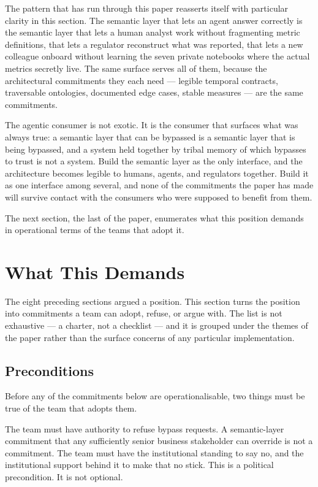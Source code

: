 \documentclass[11pt,a4paper]{article}
\begin{document}
The pattern that has run through this paper reasserts itself with particular clarity in this section. The semantic layer that lets an agent answer correctly is the semantic layer that lets a human analyst work without fragmenting metric definitions, that lets a regulator reconstruct what was reported, that lets a new colleague onboard without learning the seven private notebooks where the actual metrics secretly live. The same surface serves all of them, because the architectural commitments they each need --- legible temporal contracts, traversable ontologies, documented edge cases, stable measures --- are the same commitments.

The agentic consumer is not exotic. It is the consumer that surfaces what was always true: a semantic layer that can be bypassed is a semantic layer that is being bypassed, and a system held together by tribal memory of which bypasses to trust is not a system. Build the semantic layer as the only interface, and the architecture becomes legible to humans, agents, and regulators together. Build it as one interface among several, and none of the commitments the paper has made will survive contact with the consumers who were supposed to benefit from them.

The next section, the last of the paper, enumerates what this position demands in operational terms of the teams that adopt it.

\section{What This Demands}
\label{sec:demands}

The eight preceding sections argued a position. This section turns the position into commitments a team can adopt, refuse, or argue with. The list is not exhaustive --- a charter, not a checklist --- and it is grouped under the themes of the paper rather than the surface concerns of any particular implementation.

\subsection{Preconditions}

Before any of the commitments below are operationalisable, two things must be true of the team that adopts them.

The team must have authority to refuse bypass requests. A semantic-layer commitment that any sufficiently senior business stakeholder can override is not a commitment. The team must have the institutional standing to say no, and the institutional support behind it to make that no stick. This is a political precondition. It is not optional.
\end{document}
